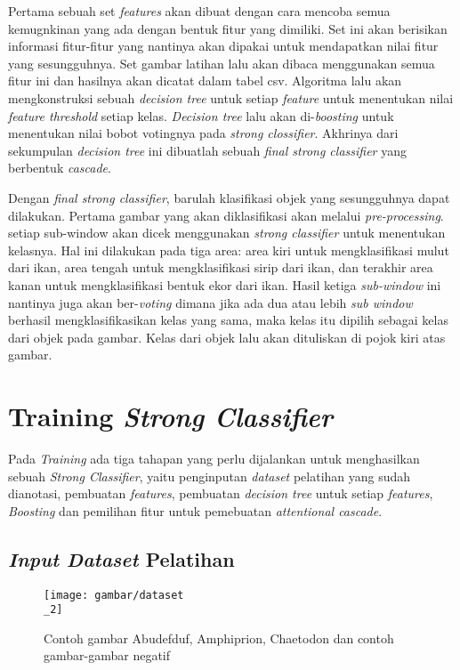 Pertama sebuah set \textit{features} akan dibuat dengan cara mencoba semua kemugnkinan 
yang ada dengan bentuk fitur yang dimiliki. Set ini akan berisikan informasi fitur-fitur 
yang nantinya akan dipakai untuk mendapatkan nilai fitur yang sesungguhnya. Set gambar latihan 
lalu akan dibaca menggunakan semua fitur ini dan hasilnya akan dicatat dalam tabel csv. 
Algoritma lalu akan mengkonstruksi sebuah \emph{decision tree} untuk setiap 
\emph{feature} untuk menentukan nilai \textit{feature threshold} setiap kelas. 
\emph{Decision tree} lalu akan di-\textit{boosting} untuk menentukan nilai bobot votingnya 
pada \textit{strong clossifier}. Akhrinya dari sekumpulan \emph{decision tree} ini dibuatlah 
sebuah \emph{final strong classifier} yang berbentuk \textit{cascade}.

Dengan \emph{final strong classifier}, barulah klasifikasi objek yang sesungguhnya dapat dilakukan. 
Pertama gambar yang akan diklasifikasi akan melalui \emph{pre-processing}. setiap sub-window akan dicek menggunakan 
\emph{strong classifier} untuk menentukan kelasnya. Hal ini dilakukan pada tiga area: area kiri untuk 
mengklasifikasi mulut dari ikan, area tengah untuk mengklasifikasi sirip dari ikan, dan terakhir area kanan 
untuk mengklasifikasi bentuk ekor dari ikan. Hasil ketiga \textit{sub-window} ini nantinya juga akan ber-\textit{voting}
dimana jika ada dua atau lebih \textit{sub window} berhasil mengklasifikasikan kelas yang sama, maka kelas itu 
dipilih sebagai kelas dari objek pada gambar. Kelas dari objek lalu akan dituliskan di pojok kiri atas gambar.

\section{Training \emph{Strong Classifier}}

Pada \textit{Training} ada tiga tahapan yang perlu dijalankan 
untuk menghasilkan sebuah \emph{Strong Classifier}, 
yaitu penginputan \textit{dataset} pelatihan yang sudah dianotasi, 
pembuatan \emph{features}, 
pembuatan \emph{decision tree} untuk setiap \emph{features}, 
\emph{Boosting }dan pemilihan fitur untuk pemebuatan \emph{attentional cascade}.

\subsection{\textit{Input Dataset} Pelatihan}

\begin{figure}[H]
  \centering{}
	\texttt{[image: gambar/dataset\\\_2]}
  \caption{Contoh gambar Abudefduf, Amphiprion, Chaetodon dan contoh gambar-gambar negatif}
\end{figure}

